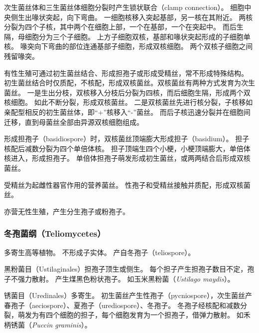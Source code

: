 \documentclass[11pt]{article}
\begin{document}
\par

次生菌丝体和三生菌丝体细胞分裂时产生锁状联合（clamp connection）。
细胞中央侧生出喙状突起，向下弯曲。
一细胞核移入突起基部，另一核在其附近。
两核分裂为四个子核，其中两个在细胞上部，一个在基部，一个在突起中。
而后生隔，母细胞分为三个子细胞。
上方子细胞双核，基部和喙状突起形成的子细胞单核。
喙突向下弯曲的部位连通基部子细胞，形成双核细胞。
两个双核子细胞之间残留喙突。

\par

有性生殖可通过初生菌丝结合、形成担孢子或形成受精丝，常不形成特殊结构。
初生菌丝结合时仅质配，不核配，形成双核菌丝。双核菌丝有两种方式发育为次生菌丝。
一是生出分枝，双核移入分枝后分裂为四核，而后细胞生隔，形成两个双核细胞。
如此不断分裂，形成双核菌丝。
二是双核菌丝先进行核分裂，子核移如亲配型相反的初生菌丝体，即“+”核移入“-”菌丝。
而后子核迅速分裂并在细胞间迁移，直到母菌丝全部由异源双核细胞组成。

\par

形成担孢子（basidiospore）时，双核菌丝顶端膨大形成担子（basidium）。
担子核配后减数分裂为四个单倍体核。
担子顶端生四个小梗，小梗顶端膨大，单倍体核进入，形成担孢子。
单倍体担孢子萌发形成初生菌丝，或两两结合后形成双核菌丝。

\par

受精丝为起雌性器官作用的营养菌丝。
性孢子和受精丝接触并质配，形成双核菌丝。

\par

亦营无性生殖，产生分生孢子或粉孢子。

\subsubsection{冬孢菌纲（Teliomycetes）}
多寄生高等植物。
不形成子实体。
产自冬孢子（teliospore）。

\par

黑粉菌目（Ustilaginales）担孢子顶生或侧生。
每个担子产生担孢子数目不定，孢子不强力散射。
产生煤黑色粉状孢子。
如玉米黑粉菌（\textit{Ustilago maydis}）。

\par

锈菌目（Uredinales）多寄生。
初生菌丝产生性孢子（pycniospore），次生菌丝产春孢子（aeciospore）、夏孢子（urediospore）、冬孢子。
冬孢子经核配和减数分裂，萌发为有四个细胞的担子，每个细胞发育为一个担孢子，借弹力散射。
如禾柄锈菌（\textit{Puccin graminis}）。
\end{document}
